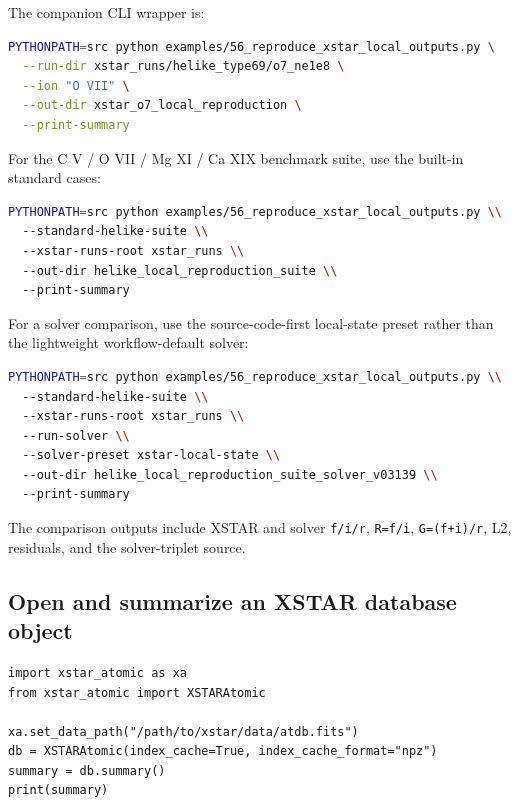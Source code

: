 \documentclass[11pt]{article}
\begin{document}
The companion CLI wrapper is:

\begin{lstlisting}[language=bash]
PYTHONPATH=src python examples/56_reproduce_xstar_local_outputs.py \
  --run-dir xstar_runs/helike_type69/o7_ne1e8 \
  --ion "O VII" \
  --out-dir xstar_o7_local_reproduction \
  --print-summary
\end{lstlisting}

For the C V / O VII / Mg XI / Ca XIX benchmark suite, use the built-in standard cases:

\begin{lstlisting}[language=bash]
PYTHONPATH=src python examples/56_reproduce_xstar_local_outputs.py \\ 
  --standard-helike-suite \\ 
  --xstar-runs-root xstar_runs \\ 
  --out-dir helike_local_reproduction_suite \\ 
  --print-summary
\end{lstlisting}

For a solver comparison, use the source-code-first local-state preset rather than the lightweight workflow-default solver:

\begin{lstlisting}[language=bash]
PYTHONPATH=src python examples/56_reproduce_xstar_local_outputs.py \\ 
  --standard-helike-suite \\ 
  --xstar-runs-root xstar_runs \\ 
  --run-solver \\ 
  --solver-preset xstar-local-state \\ 
  --out-dir helike_local_reproduction_suite_solver_v03139 \\ 
  --print-summary
\end{lstlisting}

The comparison outputs include XSTAR and solver \texttt{f/i/r}, \texttt{R=f/i}, \texttt{G=(f+i)/r}, L2, residuals, and the solver-triplet source.

\subsection{Open and summarize an XSTAR database object}

\begin{lstlisting}[style=ctpython]
import xstar_atomic as xa
from xstar_atomic import XSTARAtomic

xa.set_data_path("/path/to/xstar/data/atdb.fits")
db = XSTARAtomic(index_cache=True, index_cache_format="npz")
summary = db.summary()
print(summary)
\end{lstlisting}
\end{document}
